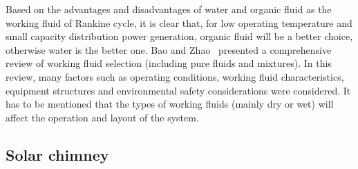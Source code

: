 Based on the advantages and disadvantages of water and organic fluid as the working fluid of Rankine cycle, it is clear that, for low operating temperature and small capacity distribution power generation, organic fluid will be a better choice, otherwise water is the better one. Bao and Zhao~\cite{Bao2013} presented a comprehensive review of working fluid selection (including pure fluids and mixtures). In this review, many factors such as operating conditions, working fluid characteristics, equipment structures and environmental safety considerations were considered.
It has to be mentioned that the types of working fluids (mainly dry or wet) will affect the operation and layout of the system.

\subsection{Solar chimney}

